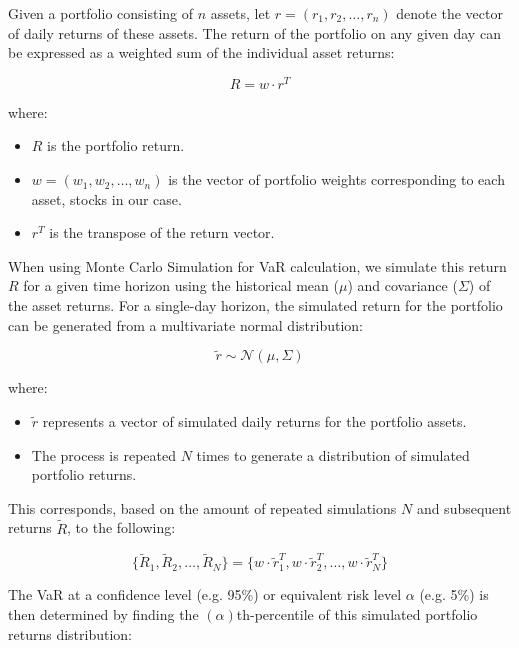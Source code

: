 \documentclass{article}
\begin{document}
Given a portfolio consisting of \(n\) assets, let \(r = (r_1, r_2, \ldots, r_n)\) denote the vector of daily returns of these assets. The return of the portfolio on any given day can be expressed as a weighted sum of the individual asset returns:

\begin{equation}
    R = w \cdot r^T
\end{equation}

where:
\begin{itemize}
  \item \(R\) is the portfolio return.
  \item \(w = (w_1, w_2, \ldots, w_n)\) is the vector of portfolio weights corresponding to each asset, stocks in our case.
  \item \(r^T\) is the transpose of the return vector.
\end{itemize}

\vspace{5cm}
When using Monte Carlo Simulation for VaR calculation, we simulate this return \(R\) for a given time horizon using the historical mean (\(\mu\)) and covariance (\(\Sigma\)) of the asset returns. For a single-day horizon, the simulated return for the portfolio can be generated from a multivariate normal distribution:

\begin{equation}
  \tilde{r} \sim \mathcal{N}(\mu, \Sigma)
\end{equation}

where:
\begin{itemize}
  \item \(\tilde{r}\) represents a vector of simulated daily returns for the portfolio assets.
  \item The process is repeated \(N\) times to generate a distribution of simulated portfolio returns.
\end{itemize}

\vspace{0.3cm}
This corresponds, based on the amount of repeated simulations \(N\) and subsequent returns \(\tilde{R}\), to the following:

\begin{equation}
    \{\tilde{R}_1, \tilde{R}_2, \ldots, \tilde{R}_N\} = \{w \cdot \tilde{r}_1^T, w \cdot \tilde{r}_2^T, \ldots, w \cdot \tilde{r}_N^T\}
\end{equation}

\vspace{0.3cm}
The VaR at a confidence level (e.g. 95\%) or equivalent risk level \(\alpha\) (e.g. 5\%) is then determined by finding the \((\alpha)\)th-percentile of this simulated portfolio returns distribution:
\end{document}
